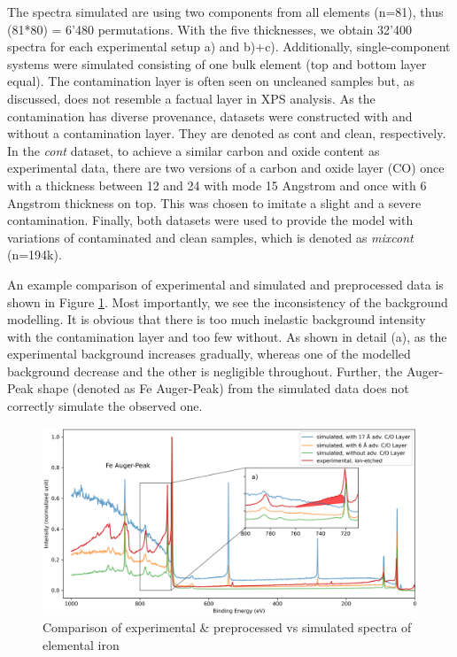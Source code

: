 The spectra simulated are using two components from all elements (n=81), thus (81*80) = 6'480 permutations. With the five thicknesses, we obtain 32'400 spectra for each experimental setup a) and b)+c). Additionally, single-component systems were simulated consisting of one bulk element (top and bottom layer equal). The contamination layer is often seen on uncleaned samples but, as discussed, does not resemble a factual layer in XPS analysis. As the contamination has diverse provenance, datasets were constructed with and without a contamination layer. They are denoted as cont and clean, respectively. In the \emph{cont} dataset, to achieve a similar carbon and oxide content as experimental data, there are two versions of a carbon and oxide layer (CO) once with a thickness between 12 and 24 with mode 15 Angstrom and once with 6 Angstrom thickness on top. This was chosen to imitate a slight and a severe contamination. Finally, both datasets were used to provide the model with variations of contaminated and clean samples, which is denoted as \emph{mixcont} (n=194k).

An example comparison of experimental and simulated and preprocessed data is shown in Figure \ref{fig:ex_vs_sim}. Most importantly, we see the inconsistency of the background modelling. It is obvious that there is too much inelastic background intensity with the contamination layer and too few without. As shown in detail (a), as the experimental background increases gradually, whereas one of the modelled background decrease and the other is negligible throughout. Further, the Auger-Peak shape (denoted as Fe Auger-Peak) from the simulated data does not correctly simulate the observed one.

\begin{figure}[H]
    \includegraphics[width=\textwidth]{Figures/Fe_XPS.png}
    \caption{Comparison of experimental \& preprocessed vs simulated spectra of elemental iron}
    \label{fig:ex_vs_sim}
    \centering
\end{figure}

